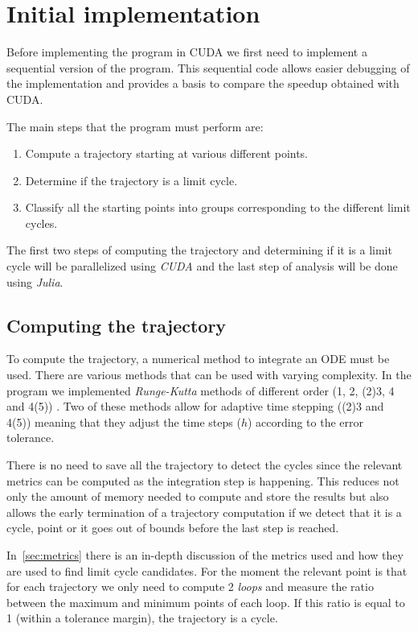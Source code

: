 \pagebreak
\section{Initial implementation}%
\label{sec:initial_implementation}

Before implementing the program in CUDA we first need to implement a sequential
version of the program. This sequential code allows easier debugging of the
implementation and provides a basis to compare the speedup obtained with CUDA.

The main steps that the program must perform are:

\begin{enumerate}
    \item Compute a trajectory starting at various different points.
    \item Determine if the trajectory is a limit cycle.
    \item Classify all the starting points into groups corresponding to
        the different limit cycles.
\end{enumerate}

The first two steps of computing the trajectory and determining if it is a
limit cycle will be parallelized using \emph{CUDA} and the last step of analysis
will be done using \emph{Julia}.

\subsection{Computing the trajectory}

To compute the trajectory, a numerical method to integrate an ODE must be used.
There are various methods that can be used with varying complexity. In the
program we implemented \emph{Runge-Kutta} methods of different order (1, 2, (2)3, 4 and
4(5)) \cite{butcher_numerical_2008}. Two of these methods allow for adaptive
time stepping ((2)3 and 4(5)) meaning that they adjust the time steps ($h$)
according to the error tolerance.

There is no need to save all the trajectory to detect the cycles since the
relevant metrics can be computed as the integration step is happening.
This reduces not only the amount of memory needed to compute and store the
results but also allows the early termination of a trajectory computation if
we detect that it is a cycle, point or it goes out of bounds before the last
step is reached.

In~\cref{sec:metrics} there is an in-depth discussion of the metrics used and
how they are used to find limit cycle candidates. For the moment the relevant
point is that for each trajectory we only need to compute 2 \emph{loops} and
measure the ratio between the maximum and minimum points of each loop. If this
ratio is equal to 1 (within a tolerance margin), the trajectory is a cycle.



